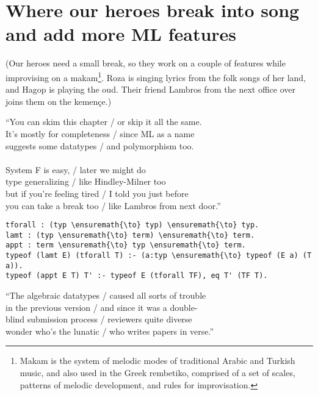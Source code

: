 \section{Where our heroes break into song and add more ML
features}\label{where-our-heroes-break-into-song-and-add-more-ml-features}

\begin{scenecomment}
(Our heroes need a small break, so they work on a couple of features while improvising on a makam\footnote{Makam is the system of melodic modes of traditional Arabic and Turkish music, and also used in the Greek rembetiko, comprised of a set of scales, patterns of melodic development, and rules for improvisation.}. Roza is singing lyrics from the folk songs of her land, and Hagop is playing the oud. Their friend Lambros from the next office over joins them on the kemen\c{c}e.)
\end{scenecomment}

\begin{versy}
``You can skim this chapter / or skip it all the same. \\
It's mostly for completeness / since ML as a name \\
suggests some datatypes / and polymorphism too. \\
\hspace{1em} \vspace{-0.5em} \\
System F is easy, / later we might do \\
type generalizing / like Hindley-Milner too \\
but if you're feeling tired / I told you just before \\
you can take a break too / like Lambros from next door.''
\end{versy}

\begin{verbatim}
tforall : (typ \ensuremath{\to} typ) \ensuremath{\to} typ.
lamt : (typ \ensuremath{\to} term) \ensuremath{\to} term.
appt : term \ensuremath{\to} typ \ensuremath{\to} term.
typeof (lamt E) (tforall T) :- (a:typ \ensuremath{\to} typeof (E a) (T a)).
typeof (appt E T) T' :- typeof E (tforall TF), eq T' (TF T).
\end{verbatim}

\begin{versy}
``The algebraic datatypes / caused all sorts of trouble \\
in the previous version / and since it was a double- \\
blind submission process / reviewers quite diverse \\
wonder who's the lunatic / who writes papers in verse.''
\end{versy}

